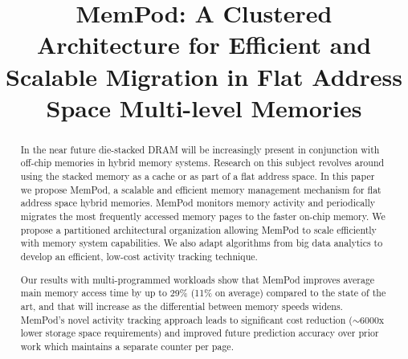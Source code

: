 \documentclass{sig-alternate}
\title {MemPod: A Clustered Architecture for Efficient and Scalable Migration in Flat Address Space Multi-level Memories}
\author{}
\begin{document}
\maketitle
\thispagestyle{firstpage}
\pagestyle{plain}

\begin{abstract}

%

In the near future die-stacked DRAM will be increasingly
present in conjunction with 
off-chip memories in hybrid memory systems. Research on this subject revolves around using the stacked memory as a cache or as part of a flat address space. In this paper we propose MemPod, a scalable and efficient memory management mechanism for flat address space hybrid memories. MemPod monitors memory activity and periodically migrates the most frequently accessed memory pages to the faster on-chip memory. We propose a partitioned architectural organization allowing MemPod to scale efficiently with memory system capabilities. We also adapt algorithms from big data analytics to develop an efficient, low-cost activity tracking technique. 

Our results with multi-programmed workloads show that MemPod improves average main memory access time by up to 29\% (11\% on average) compared to the state of the art, and that will increase as the differential between memory speeds
widens.
MemPod's novel activity tracking approach leads to significant cost reduction ($\sim$6000x lower storage space requirements) and improved future prediction accuracy over prior work which maintains a separate counter per page.

\end{abstract}
\end{document}
